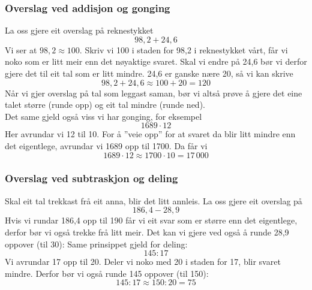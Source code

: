 
\subsubsection{Overslag ved addisjon og gonging}
La oss gjere  eit overslag på reknestykket
\[ 98,2+24,6 \]
Vi ser at $ 98,2\approx 100 $. Skriv vi 100 i staden for 98,2 i reknestykket vårt, får vi noko som er litt meir enn det nøyaktige svaret. Skal vi endre på 24,6 bør vi derfor gjere det til eit tal som er litt mindre. 24,6 er ganske nære 20, så vi kan skrive 
\[ 98,2+24,6 \approx 100 + 20 = 120 \]
Når vi gjer overslag på tal som leggast saman, bør vi altså prøve å gjere det eine talet større (runde opp) og  eit  tal mindre (runde ned).\\

\linje
Det same gjeld også viss vi har gonging, for eksempel
\[ 1689\cdot12 \]
Her avrundar vi 12 til 10. For å ''veie opp'' for at svaret da blir litt mindre enn det eigentlege, avrundar vi 1689 opp til 1700. Da får vi
\[ 1689\cdot12\approx 1700\cdot 10 =17\,000 \]
\subsubsection{Overslag ved subtraskjon og deling}
Skal  eit  tal trekkast frå  eit  anna, blir det litt annleis. La oss gjere  eit overslag på
\[ 186,4-28,9 \]
Hvis vi rundar 186,4 opp til 190 får vi  eit  svar som er større enn det eigentlege, derfor bør vi også trekke frå litt meir. Det kan vi gjere ved også å runde 28,9 oppover (til 30):
Same prinsippet gjeld for deling: 
\[ 145:17 \]
Vi avrundar 17 opp til 20. Deler vi noko med 20 i staden for 17, blir svaret mindre. Derfor bør vi også runde 145 oppover (til 150):
\[ 145:17 \approx 150:20 = 75 \]

